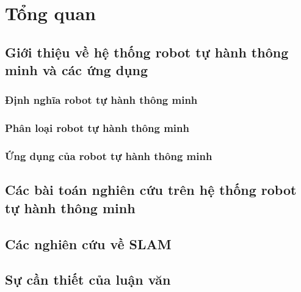\chapter{Tổng quan}

\section{Giới thiệu về hệ thống robot tự hành thông minh và các ứng dụng}


\subsection{Định nghĩa robot tự hành thông minh}

\subsection{Phân loại robot tự hành thông minh}

\subsection{Ứng dụng của robot tự hành thông minh}

\section{Các bài toán nghiên cứu trên hệ thống robot tự hành thông minh}

\section{Các nghiên cứu về SLAM}

\section{Sự cần thiết của luận văn}
